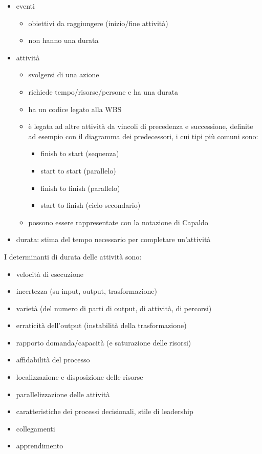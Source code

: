 \documentclass[answers, a4paper, 11pt]{exam}
\begin{document}
\begin{itemize}
    \item eventi
    \begin{itemize}
    \item obiettivi da raggiungere (inizio/fine attività)
    \item non hanno una durata
    \end{itemize}
    \item attività
    \begin{itemize}
        \item svolgersi di una azione
        \item richiede tempo/risorse/persone e ha una durata
        \item ha un codice legato alla WBS
        \item è legata ad altre attività da vincoli di precedenza e successione, definite ad esempio con il diagramma dei predecessori, i cui tipi più comuni sono:
        \begin{itemize}
            \item finish to start (sequenza)
            \item start to start (parallelo)
            \item finish to finish (parallelo)
            \item start to finish (ciclo secondario)
        \end{itemize}
        \item possono essere rappresentate con la notazione di Capaldo
    \end{itemize}
    \item durata: stima del tempo necessario per completare un'attività
\end{itemize}

I determinanti di durata delle attività sono:

\begin{itemize}
    \item velocità di esecuzione
    \item incertezza (su input, output, trasformazione)
    \item varietà (del numero di parti di output, di attività, di percorsi)
    \item erraticità dell'output (instabilità della trasformazione)
    \item rapporto domanda/capacità (e saturazione delle risorsi)
    \item affidabilità del processo
    \item localizzazione e disposizione delle risorse
    \item parallelizzazione delle attività
    \item caratteristiche dei processi decisionali, stile di leadership
    \item collegamenti
    \item apprendimento
\end{itemize}
\end{document}
